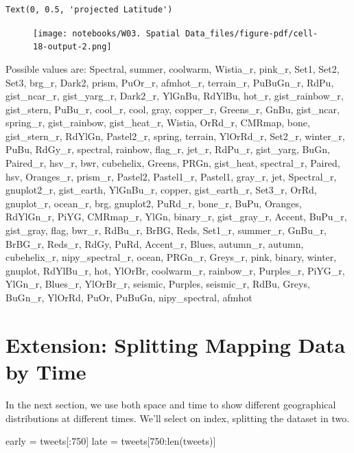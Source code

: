 \documentclass[
  letterpaper,
  DIV=11,
  numbers=noendperiod]{scrreprt}
\newenvironment{Shaded}{\begin{snugshade}}{\end{snugshade}}
\newcommand{\BuiltInTok}[1]{\textcolor[rgb]{0.00,0.23,0.31}{#1}}
\newcommand{\DecValTok}[1]{\textcolor[rgb]{0.68,0.00,0.00}{#1}}
\newcommand{\NormalTok}[1]{\textcolor[rgb]{0.00,0.23,0.31}{#1}}
\newcommand{\OperatorTok}[1]{\textcolor[rgb]{0.37,0.37,0.37}{#1}}
\begin{document}
\begin{verbatim}
Text(0, 0.5, 'projected Latitude')
\end{verbatim}

\begin{figure}[H]

{\centering \texttt{[image: notebooks/W03. Spatial Data\_files/figure-pdf/cell-18-output-2.png]}

}

\end{figure}

Possible values are: Spectral, summer, coolwarm, Wistia\_r, pink\_r,
Set1, Set2, Set3, brg\_r, Dark2, prism, PuOr\_r, afmhot\_r, terrain\_r,
PuBuGn\_r, RdPu, gist\_ncar\_r, gist\_yarg\_r, Dark2\_r, YlGnBu, RdYlBu,
hot\_r, gist\_rainbow\_r, gist\_stern, PuBu\_r, cool\_r, cool, gray,
copper\_r, Greens\_r, GnBu, gist\_ncar, spring\_r, gist\_rainbow,
gist\_heat\_r, Wistia, OrRd\_r, CMRmap, bone, gist\_stern\_r, RdYlGn,
Pastel2\_r, spring, terrain, YlOrRd\_r, Set2\_r, winter\_r, PuBu,
RdGy\_r, spectral, rainbow, flag\_r, jet\_r, RdPu\_r, gist\_yarg, BuGn,
Paired\_r, hsv\_r, bwr, cubehelix, Greens, PRGn, gist\_heat,
spectral\_r, Paired, hsv, Oranges\_r, prism\_r, Pastel2, Pastel1\_r,
Pastel1, gray\_r, jet, Spectral\_r, gnuplot2\_r, gist\_earth, YlGnBu\_r,
copper, gist\_earth\_r, Set3\_r, OrRd, gnuplot\_r, ocean\_r, brg,
gnuplot2, PuRd\_r, bone\_r, BuPu, Oranges, RdYlGn\_r, PiYG, CMRmap\_r,
YlGn, binary\_r, gist\_gray\_r, Accent, BuPu\_r, gist\_gray, flag,
bwr\_r, RdBu\_r, BrBG, Reds, Set1\_r, summer\_r, GnBu\_r, BrBG\_r,
Reds\_r, RdGy, PuRd, Accent\_r, Blues, autumn\_r, autumn, cubehelix\_r,
nipy\_spectral\_r, ocean, PRGn\_r, Greys\_r, pink, binary, winter,
gnuplot, RdYlBu\_r, hot, YlOrBr, coolwarm\_r, rainbow\_r, Purples\_r,
PiYG\_r, YlGn\_r, Blues\_r, YlOrBr\_r, seismic, Purples, seismic\_r,
RdBu, Greys, BuGn\_r, YlOrRd, PuOr, PuBuGn, nipy\_spectral, afmhot

\hypertarget{extension-splitting-mapping-data-by-time}{%
\section{Extension: Splitting Mapping Data by
Time}\label{extension-splitting-mapping-data-by-time}}

In the next section, we use both space and time to show different
geographical distributions at different times. We'll select on index,
splitting the dataset in two.

\begin{Shaded}
\begin{Highlighting}[]
\NormalTok{early }\OperatorTok{=}\NormalTok{ tweets[:}\DecValTok{750}\NormalTok{]}
\NormalTok{late }\OperatorTok{=}\NormalTok{ tweets[}\DecValTok{750}\NormalTok{:}\BuiltInTok{len}\NormalTok{(tweets)]}
\end{Highlighting}
\end{Shaded}
\end{document}
